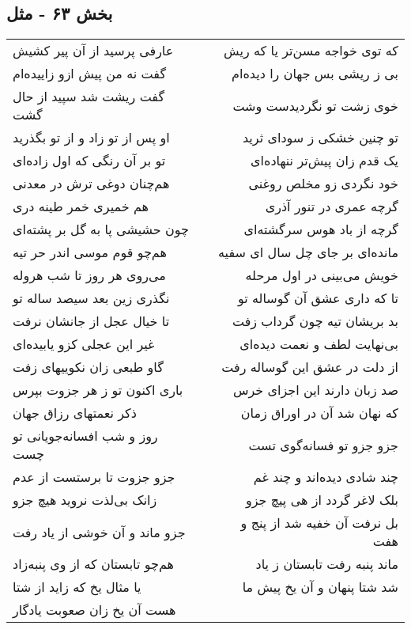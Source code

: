 \begin{center}
\section*{بخش ۶۳ - مثل}
\label{sec:sh063}
\begin{longtable}{l p{0.5cm} r}
عارفی پرسید از آن پیر کشیش
&&
که توی خواجه مسن‌تر یا که ریش
\\
گفت نه من پیش ازو زاییده‌ام
&&
بی ز ریشی بس جهان را دیده‌ام
\\
گفت ریشت شد سپید از حال گشت
&&
خوی زشت تو نگردیدست وشت
\\
او پس از تو زاد و از تو بگذرید
&&
تو چنین خشکی ز سودای ثرید
\\
تو بر آن رنگی که اول زاده‌ای
&&
یک قدم زان پیش‌تر ننهاده‌ای
\\
هم‌چنان دوغی ترش در معدنی
&&
خود نگردی زو مخلص روغنی
\\
هم خمیری خمر طینه دری
&&
گرچه عمری در تنور آذری
\\
چون حشیشی پا به گل بر پشته‌ای
&&
گرچه از باد هوس سرگشته‌ای
\\
هم‌چو قوم موسی اندر حر تیه
&&
مانده‌ای بر جای چل سال ای سفیه
\\
می‌روی هر روز تا شب هروله
&&
خویش می‌بینی در اول مرحله
\\
نگذری زین بعد سیصد ساله تو
&&
تا که داری عشق آن گوساله تو
\\
تا خیال عجل از جانشان نرفت
&&
بد بریشان تیه چون گرداب زفت
\\
غیر این عجلی کزو یابیده‌ای
&&
بی‌نهایت لطف و نعمت دیده‌ای
\\
گاو طبعی زان نکوییهای زفت
&&
از دلت در عشق این گوساله رفت
\\
باری اکنون تو ز هر جزوت بپرس
&&
صد زبان دارند این اجزای خرس
\\
ذکر نعمتهای رزاق جهان
&&
که نهان شد آن در اوراق زمان
\\
روز و شب افسانه‌جویانی تو چست
&&
جزو جزو تو فسانه‌گوی تست
\\
جزو جزوت تا برستست از عدم
&&
چند شادی دیده‌اند و چند غم
\\
زانک بی‌لذت نروید هیچ جزو
&&
بلک لاغر گردد از هی پیچ جزو
\\
جزو ماند و آن خوشی از یاد رفت
&&
بل نرفت آن خفیه شد از پنج و هفت
\\
هم‌چو تابستان که از وی پنبه‌زاد
&&
ماند پنبه رفت تابستان ز یاد
\\
یا مثال یخ که زاید از شتا
&&
شد شتا پنهان و آن یخ پیش ما
\\
هست آن یخ زان صعوبت یادگار

\end{longtable}
\end{center}
